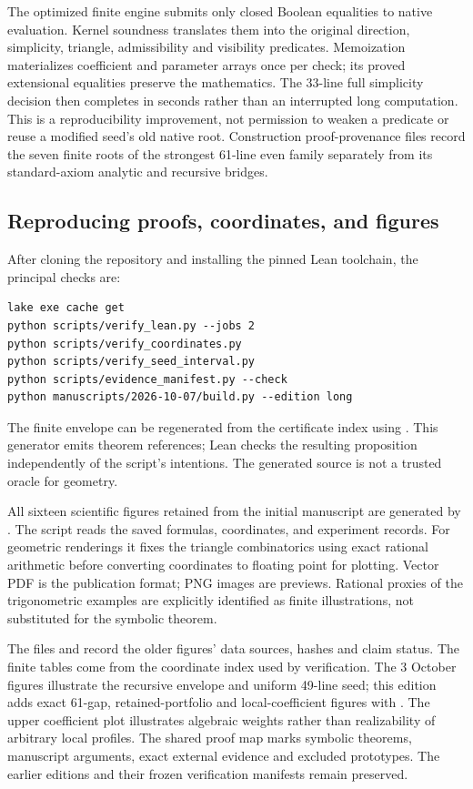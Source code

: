 The optimized finite engine submits only closed Boolean equalities to
native evaluation. Kernel soundness translates them into the original
direction, simplicity, triangle, admissibility and visibility predicates.
Memoization materializes coefficient and parameter arrays once per check;
its proved extensional equalities preserve the mathematics. The 33-line
full simplicity decision then completes in seconds rather than an
interrupted long computation. This is a reproducibility improvement,
not permission to weaken a predicate or reuse a modified seed's old
native root. Construction proof-provenance files record the seven
finite roots of the strongest 61-line even family separately from its
standard-axiom analytic and recursive bridges.

\subsection{Reproducing proofs, coordinates, and figures}

After cloning the repository and installing the pinned Lean toolchain, the principal checks are:
\begin{lstlisting}
lake exe cache get
python scripts/verify_lean.py --jobs 2
python scripts/verify_coordinates.py
python scripts/verify_seed_interval.py
python scripts/evidence_manifest.py --check
python manuscripts/2026-10-07/build.py --edition long
\end{lstlisting}
The finite envelope can be regenerated from the certificate index using . This generator emits theorem references; Lean checks the resulting proposition independently of the script's intentions. The generated source is not a trusted oracle for geometry.

All sixteen scientific figures retained from the initial manuscript are generated by . The script reads the saved formulas, coordinates, and experiment records. For geometric renderings it fixes the triangle combinatorics using exact rational arithmetic before converting coordinates to floating point for plotting. Vector PDF is the publication format; PNG images are previews. Rational proxies of the trigonometric examples are explicitly identified as finite illustrations, not substituted for the symbolic theorem.

The files  and
 record the older figures'
data sources, hashes and claim status. The finite tables come from the
coordinate index used by verification. The 3 October figures illustrate
the recursive envelope and uniform 49-line seed; this edition adds
exact 61-gap, retained-portfolio and local-coefficient figures with
. The upper coefficient plot illustrates
algebraic weights rather than realizability of arbitrary local profiles.
The shared proof map marks symbolic theorems, manuscript arguments,
exact external evidence and excluded prototypes. The earlier editions
and their frozen verification manifests remain preserved.

